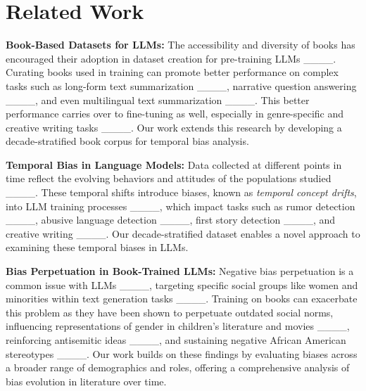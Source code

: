 \section{Related Work}
\textbf{Book-Based Datasets for LLMs:} The accessibility and diversity of books has encouraged their adoption in dataset creation for pre-training LLMs ____. Curating books used in training can promote better performance on complex tasks such as long-form text summarization ____, narrative question answering ____, and even multilingual text summarization ____. This better performance carries over to fine-tuning as well, especially in genre-specific and creative writing tasks ____. Our work extends this research by developing a decade-stratified book corpus for temporal bias analysis.

\textbf{Temporal Bias in Language Models:} Data collected at different points in time reflect the evolving behaviors and attitudes of the populations studied ____. These temporal shifts introduce biases, known as \textit{temporal concept drifts}, into LLM training processes ____, which impact tasks such as rumor detection ____, abusive language detection ____, first story detection ____, and creative writing ____. Our decade-stratified dataset enables a novel approach to examining these temporal biases in LLMs.

\textbf{Bias Perpetuation in Book-Trained LLMs:} Negative bias perpetuation is a common issue with LLMs ____, targeting specific social groups like women and minorities within text generation tasks ____. Training on books can exacerbate this problem as they have been shown to perpetuate outdated social norms, influencing representations of gender in children's literature and movies ____, reinforcing antisemitic ideas ____, and sustaining negative African American stereotypes ____. Our work builds on these findings by evaluating biases across a broader range of demographics and roles, offering a comprehensive analysis of bias evolution in literature over time.
\vspace{-1.3mm}